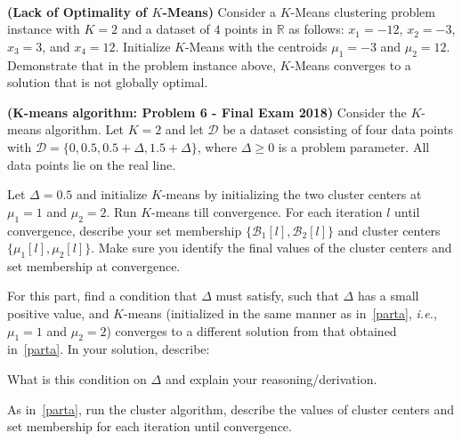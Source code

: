 \documentclass{article}
\title{\vspace{-2.5cm}\textbf{\coursefullname}\\\hatypeandnun\\\haname}
\date{}
\theoremstyle{definition}
\begin{document}
\maketitle
\vspace*{-2cm}
\begin{question}[start=1]
	\item \textbf{(Lack of Optimality of $K$-Means)} Consider a $K$-Means clustering problem instance with $K = 2$ and a dataset of $4$ points in $\mathbb{R}$ as follows: $x_1 = -12$, $x_2 = -3$, $x_3 = 3$, and $x_4 = 12$. Initialize $K$-Means with the centroids $\mu_1 = -3$ and $\mu_2 = 12$.	Demonstrate that in the problem instance above, $K$-Means converges to a solution that is not globally optimal.
	
	\item \textbf{(K-means algorithm: Problem 6 - Final Exam 2018)} Consider the $K$-means algorithm. Let $K = 2$ and let $\mathcal{D}$ be a dataset consisting of four data points with $\mathcal{D} = \{0, 0.5, 0.5 + \Delta, 1.5 + \Delta\}$, where $\Delta \geq 0$ is a problem parameter. All data points lie on the real line.
	\begin{question}
		\item \label{parta}Let $\Delta = 0.5$ and initialize $K$-means by initializing the two cluster centers at $\mu_1 = 1$ and $\mu_2 = 2$. Run $K$-means till convergence. For each iteration $l$ until convergence, describe your set membership $\{\mathcal{B}_1[l], \mathcal{B}_2[l]\}$ and cluster centers $\{\mu_1[l], \mu_2[l]\}$. Make sure you identify the final values of the cluster centers and set membership at convergence.
		\item For this part, find a condition that $\Delta$ must satisfy, such that $\Delta$ has a small positive value, and $K$-means (initialized in the same manner as in~\ref{parta}, \textit{i.e.}, $\mu_1 = 1$ and $\mu_2 = 2$) converges to a different solution from that obtained in~\ref{parta}. In your solution, describe:
		\begin{question}
			\item What is this condition on $\Delta$ and explain your reasoning/derivation.
			\item As in~\ref{parta}, run the cluster algorithm, describe the values of cluster centers and set membership for each iteration until convergence.
		\end{question}
	\end{question}
	

\end{question}
\end{document}
